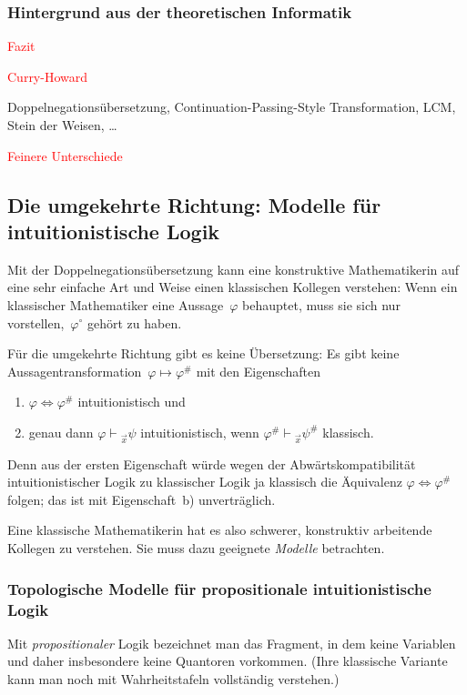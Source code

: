 \documentclass[a4paper,ngerman,12pt]{scrartcl}
\theoremstyle{definition}
\theoremstyle{plain}
\theoremstyle{remark}
\newcommand{\seq}[1]{\mathrel{\vdash\!\!\!_{#1}}}
\renewcommand{\_}{\mathpunct{.}\,}
\newcommand{\?}{\,{:}\,}
\newcommand{\XXX}[1]{\textcolor{red}{#1}}
\begin{document}
\subsubsection*{Hintergrund aus der theoretischen Informatik}



\XXX{Fazit}

\XXX{Curry-Howard}

Doppelnegationsübersetzung, Continuation-Passing-Style Transformation,
LCM, Stein der Weisen, \ldots

\XXX{Feinere Unterschiede}


\subsection{Die umgekehrte Richtung: Modelle für intuitionistische Logik}

Mit der Doppelnegationsübersetzung kann eine konstruktive Mathematikerin auf
eine sehr einfache Art und Weise einen klassischen Kollegen verstehen: Wenn ein
klassischer Mathematiker eine Aussage~$\varphi$ behauptet, muss sie sich nur
vorstellen,~$\varphi^\circ$ gehört zu haben.

Für die umgekehrte Richtung gibt es keine Übersetzung: Es gibt keine
Aussagentransformation~$\varphi \mapsto \varphi^\#$ mit den Eigenschaften
\begin{enumerate}
\item $\varphi \Longleftrightarrow \varphi^\#$ intuitionistisch und
\item genau dann $\varphi \seq{\vec x} \psi$ intuitionistisch, wenn $\varphi^\#
\seq{\vec x} \psi^\#$ klassisch.
\end{enumerate}
Denn aus der ersten Eigenschaft würde wegen der Abwärtskompatibilität
intuitionistischer Logik zu klassischer Logik ja klassisch die Äquivalenz $\varphi \Leftrightarrow
\varphi^\#$ folgen; das ist mit Eigenschaft~b) unverträglich.

Eine klassische Mathematikerin hat es also schwerer, konstruktiv arbeitende
Kollegen zu verstehen. Sie muss dazu geeignete \emph{Modelle} betrachten.


\subsubsection*{Topologische Modelle für propositionale intuitionistische
Logik}

Mit \emph{propositionaler} Logik bezeichnet man das Fragment, in dem keine
Variablen und daher insbesondere keine Quantoren vorkommen. (Ihre klassische
Variante kann man noch mit Wahrheitstafeln vollständig verstehen.)
\end{document}
